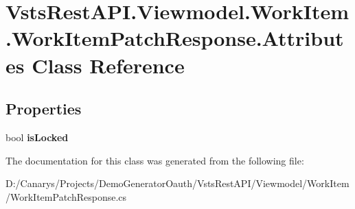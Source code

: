 \hypertarget{class_vsts_rest_a_p_i_1_1_viewmodel_1_1_work_item_1_1_work_item_patch_response_1_1_attributes}{}\section{Vsts\+Rest\+A\+P\+I.\+Viewmodel.\+Work\+Item.\+Work\+Item\+Patch\+Response.\+Attributes Class Reference}
\label{class_vsts_rest_a_p_i_1_1_viewmodel_1_1_work_item_1_1_work_item_patch_response_1_1_attributes}
\subsection*{Properties}
\begin{DoxyCompactItemize}
\item 
\mbox{\label{class_vsts_rest_a_p_i_1_1_viewmodel_1_1_work_item_1_1_work_item_patch_response_1_1_attributes_a962d30b02b3b0695da6123a9bba59631}} 
bool {\bfseries is\+Locked}
\end{DoxyCompactItemize}


The documentation for this class was generated from the following file\+:\begin{DoxyCompactItemize}
\item 
D\+:/\+Canarys/\+Projects/\+Demo\+Generator\+Oauth/\+Vsts\+Rest\+A\+P\+I/\+Viewmodel/\+Work\+Item/Work\+Item\+Patch\+Response.\+cs\end{DoxyCompactItemize}
